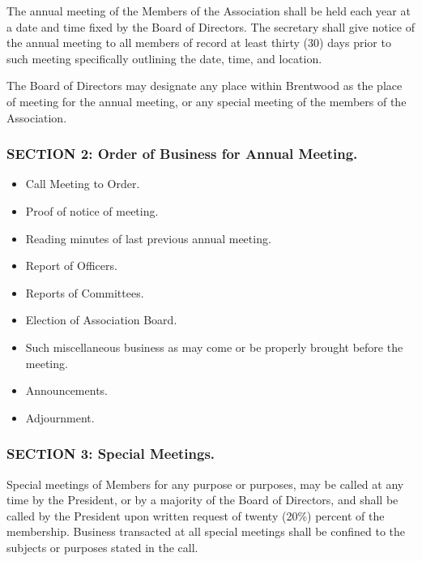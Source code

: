 The annual meeting of the Members of the Association shall be held each
year at a date and time fixed by the Board of Directors. The secretary
shall give notice of the annual meeting to all members of record at least
thirty (30) days prior to such meeting specifically outlining the date,
time, and location.

The Board of Directors may designate any place within Brentwood as the
place of meeting for the annual meeting, or any special meeting of the
members of the Association.

\subsubsection{SECTION 2: Order of Business for Annual Meeting.}

\begin{itemize}
\item Call Meeting to Order.

\item Proof of notice of meeting.

\item Reading minutes of last previous annual meeting.

\item Report of Officers.

\item Reports of Committees.

\item Election of Association Board.

\item Such miscellaneous business as may come or be properly brought
before the meeting.

\item Announcements.

\item Adjournment.

\end{itemize}


\subsubsection{SECTION 3: Special Meetings.}
Special meetings of Members for any purpose or purposes, may be called at
any time by the President, or by a majority of the Board of Directors,
and shall be called by the President upon written request of twenty
(20\%) percent of the membership. Business transacted at all special
meetings shall be confined to the subjects or purposes stated in the call.


